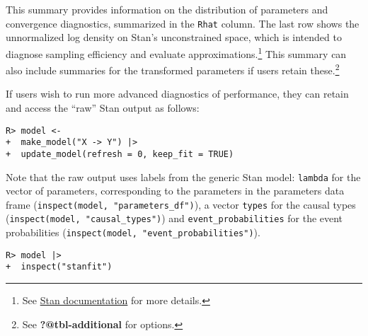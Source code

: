 \documentclass[
  11pt,
  article]{jss}
\begin{document}
This summary provides information on the distribution of parameters and
convergence diagnostics, summarized in the \texttt{Rhat} column. The
last row shows the unnormalized log density on Stan's unconstrained
space, which is intended to diagnose sampling efficiency and evaluate
approximations.\footnote{See
  \href{https://mc-stan.org/cmdstanr/reference/fit-method-lp.html}{Stan
  documentation} for more details.} This summary can also include
summaries for the transformed parameters if users retain
these.\footnote{See \textbf{?@tbl-additional} for options.}

If users wish to run more advanced diagnostics of performance, they can
retain and access the ``raw'' Stan output as follows:

\begin{verbatim}
R> model <- 
+  make_model("X -> Y") |> 
+  update_model(refresh = 0, keep_fit = TRUE)
\end{verbatim}

Note that the raw output uses labels from the generic Stan model:
\texttt{lambda} for the vector of parameters, corresponding to the
parameters in the parameters data frame
(\texttt{inspect(model,\ "parameters\_df")}), a vector \texttt{types}
for the causal types (\texttt{inspect(model,\ "causal\_types")}) and
\texttt{event\_probabilities} for the event probabilities
(\texttt{inspect(model,\ "event\_probabilities")}).

\begin{verbatim}
R> model |> 
+  inspect("stanfit")
\end{verbatim}
\end{document}
